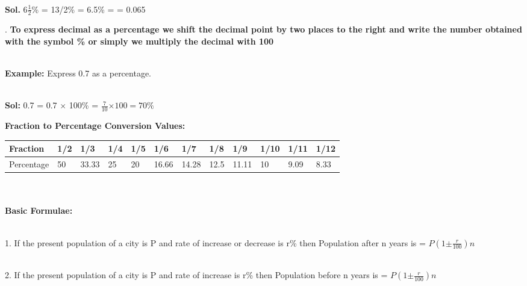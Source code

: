 \documentclass{article}
\begin{document}
\noindent \\ \textbf{Sol. }  $ 6 \frac{1}{2}$\% = 13/2\% = 6.5\% = = 0.065 \\

\noindent 

\noindent 

. \textbf{To express decimal as a percentage we shift the decimal point by two places to the right and write the number obtained with the symbol \% or simply we multiply the decimal with 100}

\noindent \\ \textbf{Example: }Express 0.7 as a percentage.

\noindent \\ \textbf{Sol: } 0.7 = 0.7 $\mathrm{\times}$ 100\% =  $ \frac{7}{10} \mathrm{\times} 100 =70\% $

\noindent 

\noindent 

\noindent 

\noindent \textbf{Fraction to Percentage Conversion Values: \\}

\noindent 


\begin{tabular}{|p{0.9in}|p{0.2in}|p{0.3in}|p{0.2in}|p{0.2in}|p{0.3in}|p{0.3in}|p{0.3in}|p{0.3in}|p{0.3in}|p{0.3in}|p{0.3in}|} \hline 
Fraction & 1/2 & 1/3 & 1/4 & 1/5 & 1/6 & 1/7 & 1/8 & 1/9 & 1/10 & 1/11 & 1/12 \\ \hline 
Percentage & 50 & 33.33 & 25 & 20 & 16.66 & 14.28 & 12.5 & 11.11 & 10 & 9.09 & 8.33 \\ \hline 
\end{tabular}



\noindent 

\noindent \\ {\large \textbf{\\ Basic Formulae: \\}}

\noindent 

\noindent 

\noindent 

\noindent \\ 1.   If the present population of a city is P and rate of increase or decrease is r\% then Population after n years is = $ P(1 \mathrm{\pm} \frac{r}{100})n $ 

\noindent \\ 2.   If the present population of a city is P and rate of increase is r\% then Population before  n years is = $ P(1 \mathrm{\pm} \frac{r}{100})n $
\end{document}
